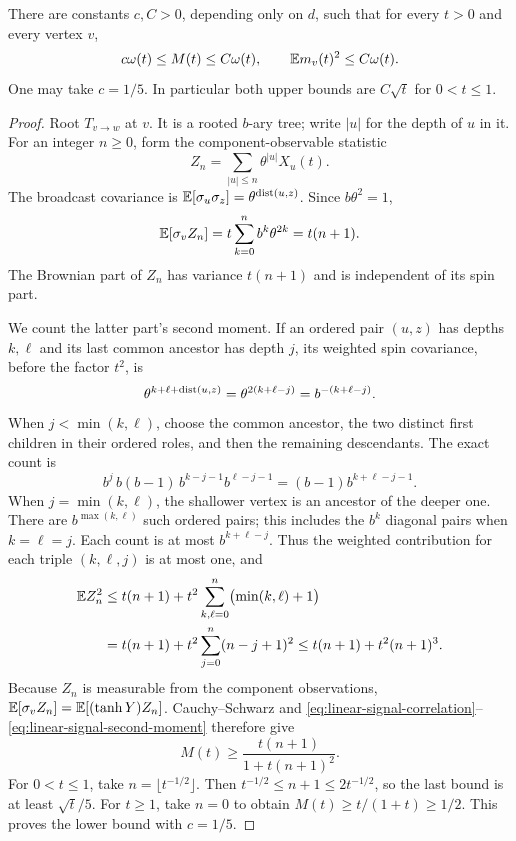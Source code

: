 \begin{lemma}
\label{lem:critical-information}
There are constants \(c,C>0\), depending only on \(d\), such that for
every \(t>0\) and every vertex \(v\),
\begin{equation}
\label{eq:critical-information}
 c\omega(t)\le M(t)\le C\omega(t),
 \qquad
 \mathbb E m_v(t)^2\le C\omega(t).
\end{equation}
One may take \(c=1/5\).  In particular both upper bounds are
\(C\sqrt t\) for \(0<t\le1\).
\end{lemma}

\begin{proof}
Root \(T_{v\to w}\) at \(v\).  It is a rooted \(b\)-ary tree; write
\(|u|\) for the depth of \(u\) in it.  For an integer \(n\ge0\), form
the component-observable statistic
\[
 Z_n=\sum_{|u|\le n}\theta^{|u|}X_u(t).
\]
The broadcast covariance is
\(\mathbb E[\sigma_u\sigma_z]=\theta^{\operatorname{dist}(u,z)}\).  Since
\(b\theta^2=1\),
\begin{equation}
\label{eq:linear-signal-correlation}
 \mathbb E[\sigma_vZ_n]
   =t\sum_{k=0}^n b^k\theta^{2k}=t(n+1).
\end{equation}
The Brownian part of \(Z_n\) has variance \(t(n+1)\) and is independent
of its spin part.

We count the latter part's second moment.  If an ordered pair
\((u,z)\) has depths \(k,\ell\) and its last common ancestor has
depth \(j\), its weighted spin covariance, before the factor \(t^2\),
is
\[
 \theta^{k+\ell+\operatorname{dist}(u,z)}
   =\theta^{2(k+\ell-j)}
   =b^{-(k+\ell-j)}.
\]
When \(j<\min(k,\ell)\), choose the common ancestor, the two distinct
first children in their ordered roles, and then the remaining
descendants.  The exact count is
\[
 b^j\,b(b-1)\,b^{k-j-1}b^{\ell-j-1}
       =(b-1)b^{k+\ell-j-1}.
\]
When \(j=\min(k,\ell)\), the shallower vertex is an ancestor of the
deeper one.  There are \(b^{\max(k,\ell)}\) such ordered pairs;
this includes the \(b^k\) diagonal pairs when \(k=\ell=j\).
Each count is at most \(b^{k+\ell-j}\).  Thus the weighted
contribution for each triple \((k,\ell,j)\) is at most one, and
\begin{align}
 \mathbb E Z_n^2
 &\le t(n+1)+t^2
       \sum_{k,\ell=0}^n\bigl(\min(k,\ell)+1\bigr)\notag\\
 &=t(n+1)+t^2\sum_{j=0}^n(n-j+1)^2
 \le t(n+1)+t^2(n+1)^3.
 \label{eq:linear-signal-second-moment}
\end{align}
Because \(Z_n\) is measurable from the component observations,
\(\mathbb E[\sigma_vZ_n]=\mathbb E[(\tanh Y)Z_n]\).  Cauchy--Schwarz and
\eqref{eq:linear-signal-correlation}--\eqref{eq:linear-signal-second-moment}
therefore give
\begin{equation}
\label{eq:critical-information-lower}
 M(t)\ge\frac{t(n+1)}{1+t(n+1)^2}.
\end{equation}
For \(0<t\le1\), take \(n=\lfloor t^{-1/2}\rfloor\).  Then
\(t^{-1/2}\le n+1\le2t^{-1/2}\), so the last bound is at least
\(\sqrt t/5\).  For \(t\ge1\), take \(n=0\) to obtain
\(M(t)\ge t/(1+t)\ge1/2\).  This proves the lower bound with
\(c=1/5\).


\end{proof}
